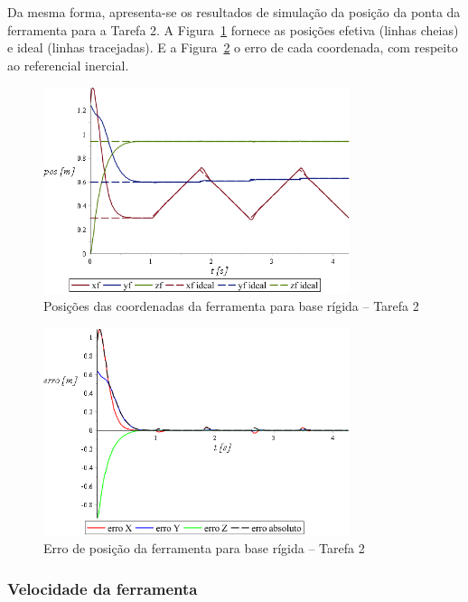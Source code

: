 Da mesma forma, apresenta-se os resultados de simulação da posição da ponta da
ferramenta para a Tarefa 2. A Figura~\ref{fig::t2_posf_base_rig} fornece as
posições efetiva (linhas cheias) e ideal (linhas tracejadas). E a
Figura~\ref{fig::t2_erroposf_base_rig} o erro de cada coordenada, com respeito
ao referencial inercial.

\begin{figure}[h!]
	\centering 
 	\includegraphics[width=0.80\textwidth]{figs/t2_posf_base_rig}
 	\caption{Posições das coordenadas da ferramenta para base rígida -- Tarefa 2}
 	\label{fig::t2_posf_base_rig}
\end{figure}

\begin{figure}[h!]
	\centering 
 	\includegraphics[width=0.80\textwidth]{figs/t2_erroposf_base_rig}
 	\caption{Erro de posição da ferramenta para base rígida -- Tarefa 2}
 	\label{fig::t2_erroposf_base_rig}
\end{figure}


\subsubsection{Velocidade da ferramenta}

